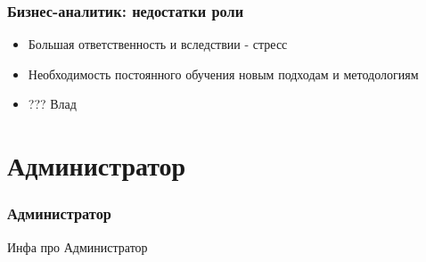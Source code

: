 \documentclass{../industrial-development}
\begin{document}
	\begin{frame} \frametitle{Бизнес-аналитик: недостатки роли}
		\begin{itemize}
			\item Большая ответственность и вследствии - стресс
			\item Необходимость постоянного обучения новым подходам и методологиям
			\item ??? Влад
		\end{itemize}
	\end{frame}
	
	
	\section{Администратор} 
	
	\begin{frame} \frametitle{Администратор}
		\begin{block}{}
			\alert {}Инфа про Администратор
		\end{block}
		
	\end{frame}
	
	
\end{document}
